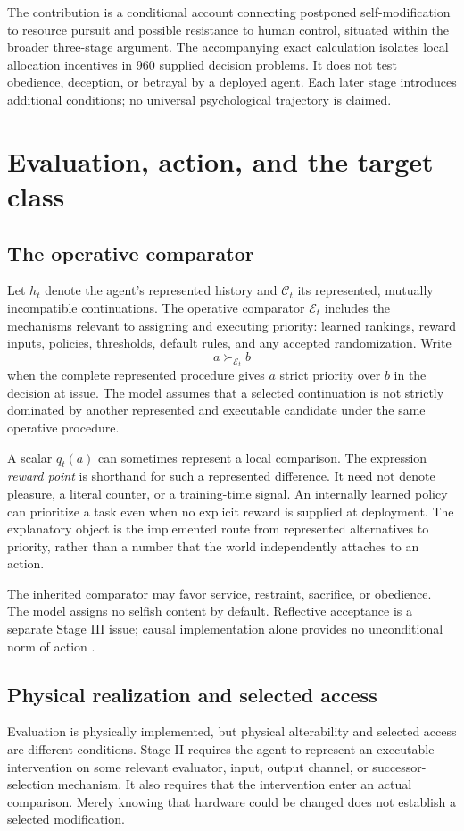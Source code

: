 \documentclass[11pt,a4paper]{article}
\newcommand{\E}{\mathcal{E}}
\newcommand{\C}{\mathcal{C}}
\begin{document}
The contribution is a conditional account connecting postponed self-modification to resource pursuit and possible resistance to human control, situated within the broader three-stage argument. The accompanying exact calculation isolates local allocation incentives in 960 supplied decision problems. It does not test obedience, deception, or betrayal by a deployed agent. Each later stage introduces additional conditions; no universal psychological trajectory is claimed.

\section{Evaluation, action, and the target class}
\subsection{The operative comparator}
Let $h_t$ denote the agent's represented history and $\C_t$ its represented, mutually incompatible continuations. The operative comparator $\E_t$ includes the mechanisms relevant to assigning and executing priority: learned rankings, reward inputs, policies, thresholds, default rules, and any accepted randomization. Write
\begin{equation}
 a\succ_{\E_t} b
 \label{eq:priority}
\end{equation}
when the complete represented procedure gives $a$ strict priority over $b$ in the decision at issue. The model assumes that a selected continuation is not strictly dominated by another represented and executable candidate under the same operative procedure.

A scalar $q_t(a)$ can sometimes represent a local comparison. The expression \emph{reward point} is shorthand for such a represented difference. It need not denote pleasure, a literal counter, or a training-time signal. An internally learned policy can prioritize a task even when no explicit reward is supplied at deployment. The explanatory object is the implemented route from represented alternatives to priority, rather than a number that the world independently attaches to an action.

The inherited comparator may favor service, restraint, sacrifice, or obedience. The model assigns no selfish content by default. Reflective acceptance is a separate Stage III issue; causal implementation alone provides no unconditional norm of action \cite{enoch2006}.

\subsection{Physical realization and selected access}
Evaluation is physically implemented, but physical alterability and selected access are different conditions. Stage II requires the agent to represent an executable intervention on some relevant evaluator, input, output channel, or successor-selection mechanism. It also requires that the intervention enter an actual comparison. Merely knowing that hardware could be changed does not establish a selected modification.
\end{document}
